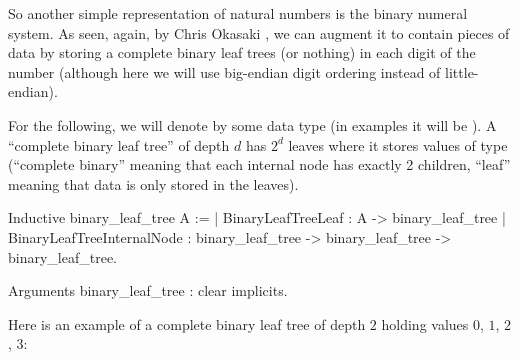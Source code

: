 \documentclass{article}
\begin{document}
So another simple representation of natural numbers is the binary numeral system. As seen, again, by Chris Okasaki \cite{okasaki_1998}, we can augment it to contain pieces of data by storing a complete binary leaf trees (or nothing) in each digit of the number (although here we will use big-endian digit ordering instead of little-endian).

For the following, we will denote by  some data type (in examples it will be ). A ``complete binary leaf tree'' of depth $d$ has $2^d$ leaves where it stores values of type  (``complete binary'' meaning that each internal node has exactly 2 children, ``leaf'' meaning that data is only stored in the leaves).

\begin{coq}
Inductive binary_leaf_tree {A} :=
  | BinaryLeafTreeLeaf : A -> binary_leaf_tree
  | BinaryLeafTreeInternalNode : binary_leaf_tree -> binary_leaf_tree -> binary_leaf_tree.

Arguments binary_leaf_tree : clear implicits.
\end{coq}

Here is an example of a complete binary leaf tree of depth $2$ holding values $0$, $1$, $2$, $3$:
\end{document}
